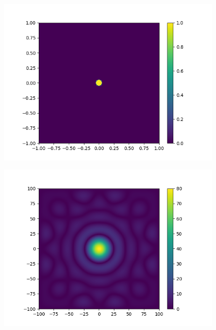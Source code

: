 \begin{figure}[htbp]
	\begin{minipage}[ht]{0.48\hsize}\centering
		\includegraphics[width=\linewidth]{src/figures/result/circle1_original_estimation.png}
		\label{subfig:amplitude_sim_circle1_original}
	\end{minipage}
	\begin{minipage}[ht]{0.48\hsize}\centering
		\includegraphics[width=\linewidth]{src/figures/result/circle1_amplitude_estimation.png}
		\label{subfig:amplitude_sim_circle1}
	\end{minipage}


\end{figure}

